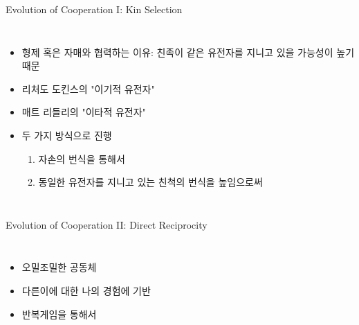 \documentclass[final]{beamer}
\begin{document}
\begin{frame}[t]{Evolution of Cooperation I: Kin Selection}
	\begin{columns}[c]
	\column{20em}
	\begin{itemize}
	\item 형제 혹은 자매와 협력하는 이유: 친족이 같은 유전자를 지니고 있을 가능성이 높기 때문  
	\item 리처도 도킨스의  "이기적 유전자"
	\item 매트 리들리의 "이타적 유전자"
	\item 두 가지 방식으로 진행
	\begin{enumerate}
	\item 자손의 번식을 통해서 
	\item 동일한 유전자를 지니고 있는 친척의 번식을 높임으로써 
	\end{enumerate}
	\end{itemize}
	\column{12em}
	\end{columns}
\end{frame}

\begin{frame}[t]{Evolution of Cooperation II: Direct Reciprocity}
	\begin{columns}[c]
	\column{20em}
	\begin{itemize}
	\item 오밀조밀한 공동체 
	\item 다른이에 대한 나의 경험에 기반 
	\item 반복게임을 통해서 
	\end{itemize}
	\column{12em}
	\end{columns}
\end{frame}
\end{document}
